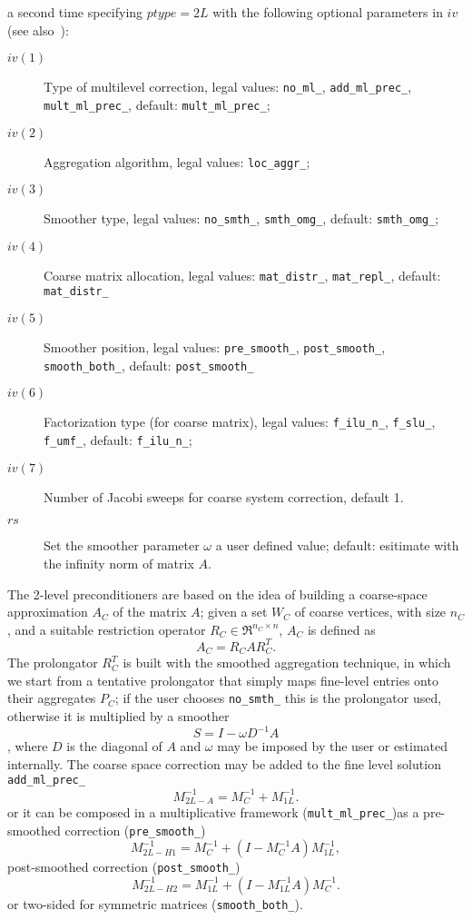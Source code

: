 a second time specifying 
$ptype=2L$ with the following optional parameters in $iv$ (see
also~\cite{APNUM06,DD2}): 
\begin{description}
\item[$iv(1)$] Type of multilevel correction, legal values: \verb|no_ml_|,
  \verb|add_ml_prec_|, \verb|mult_ml_prec_|,
  default: \verb|mult_ml_prec_|;
\item[$iv(2)$] Aggregation algorithm, legal values: \verb|loc_aggr_|;
\item[$iv(3)$] Smoother type, legal values: \verb|no_smth_|,
  \verb|smth_omg_|, default: \verb|smth_omg_|;
\item[$iv(4)$] Coarse matrix allocation, legal values:
  \verb|mat_distr_|, \verb|mat_repl_|, default: \verb|mat_distr_|
\item[$iv(5)$] Smoother position, legal values: \verb|pre_smooth_|,
  \verb|post_smooth_|, \verb|smooth_both_|, default:
  \verb|post_smooth_|
\item[$iv(6)$] Factorization type (for coarse matrix), legal values: \verb|f_ilu_n_|,
  \verb|f_slu_|, \verb|f_umf_|, default: \verb|f_ilu_n_|;
\item[$iv(7)$] Number of Jacobi sweeps for coarse system correction,
  default 1.
\item[$rs$] Set the smoother parameter $\omega$ a user defined value;
  default: esitimate with the infinity norm of matrix $A$.
\end{description}
The 2-level preconditioners are based on the idea of building a
coarse-space approximation $A_C$ of the matrix $A$; given a set $W_C$
of coarse vertices, with size $n_C$, and a suitable restriction
operator $R_C \in \Re^{n_C \times n}$, $A_C$ is defined as 
\[
A_C=R_C A R_C^T .
\]
The prolongator $R_C^T$ is built with the smoothed aggregation technique,
in which we start from a tentative prolongator that simply maps
fine-level entries onto their aggregates $P_C$; if the user chooses
\verb|no_smth_| this is the prolongator used, otherwise it is
multiplied by a smoother \[ S = I - \omega D^{-1} A \], where $D$ is
the diagonal of $A$ and  $\omega$ may be imposed by the user or
estimated internally.   
The coarse space correction may be added to the fine level solution
\verb|add_ml_prec_|
\[
M_{2L-A}^{-1} = M_{C}^{-1} + M_{1L}^{-1}. 
\]
or it can be composed  in a multiplicative framework
(\verb|mult_ml_prec_|)as a pre-smoothed correction (\verb|pre_smooth_|)
\[
M_{2L-H1}^{-1} = M_{C}^{-1} + \left( I - M_{C}^{-1}A \right) M_{1L}^{-1}, 
\]
post-smoothed correction (\verb|post_smooth_|)
\[
M_{2L-H2}^{-1} = M_{1L}^{-1} + \left( I - M_{1L}^{-1}A \right) M_{C}^{-1}. 
\]
or two-sided for symmetric matrices (\verb|smooth_both_|).



